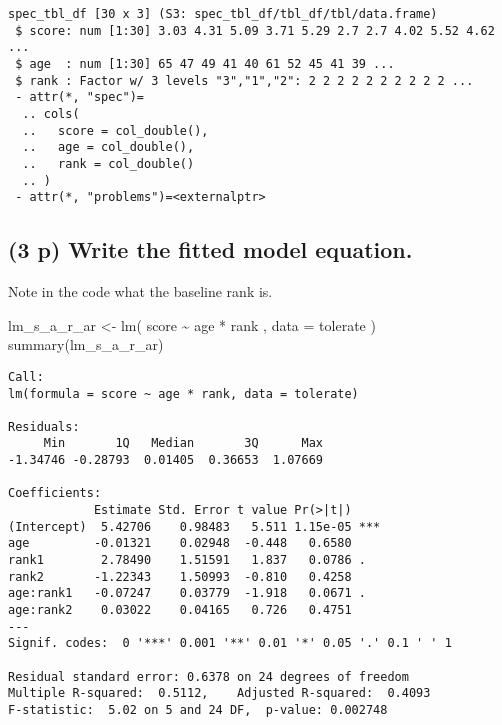 \documentclass[
  12pt,
]{article}
\newenvironment{Shaded}{\begin{snugshade}}{\end{snugshade}}
\newcommand{\AttributeTok}[1]{\textcolor[rgb]{0.77,0.63,0.00}{#1}}
\newcommand{\FunctionTok}[1]{\textcolor[rgb]{0.00,0.00,0.00}{#1}}
\newcommand{\NormalTok}[1]{#1}
\newcommand{\OtherTok}[1]{\textcolor[rgb]{0.56,0.35,0.01}{#1}}
\newcommand{\SpecialCharTok}[1]{\textcolor[rgb]{0.00,0.00,0.00}{#1}}
\begin{document}
\begin{verbatim}
spec_tbl_df [30 x 3] (S3: spec_tbl_df/tbl_df/tbl/data.frame)
 $ score: num [1:30] 3.03 4.31 5.09 3.71 5.29 2.7 2.7 4.02 5.52 4.62 ...
 $ age  : num [1:30] 65 47 49 41 40 61 52 45 41 39 ...
 $ rank : Factor w/ 3 levels "3","1","2": 2 2 2 2 2 2 2 2 2 2 ...
 - attr(*, "spec")=
  .. cols(
  ..   score = col_double(),
  ..   age = col_double(),
  ..   rank = col_double()
  .. )
 - attr(*, "problems")=<externalptr> 
\end{verbatim}

\hypertarget{p-write-the-fitted-model-equation.-1}{%
\subsection{\texorpdfstring{\textbf{(3 p)} Write the fitted model
equation.}{(3 p) Write the fitted model equation.}}\label{p-write-the-fitted-model-equation.-1}}

Note in the code what the baseline rank is.

\begin{Shaded}
\begin{Highlighting}[]
\NormalTok{lm\_s\_a\_r\_ar }\OtherTok{\textless{}{-}}
  \FunctionTok{lm}\NormalTok{(}
\NormalTok{    score }\SpecialCharTok{\textasciitilde{}}\NormalTok{ age }\SpecialCharTok{*}\NormalTok{ rank}
\NormalTok{  , }\AttributeTok{data =}\NormalTok{ tolerate}
\NormalTok{  )}
\FunctionTok{summary}\NormalTok{(lm\_s\_a\_r\_ar)}
\end{Highlighting}
\end{Shaded}

\begin{verbatim}
Call:
lm(formula = score ~ age * rank, data = tolerate)

Residuals:
     Min       1Q   Median       3Q      Max 
-1.34746 -0.28793  0.01405  0.36653  1.07669 

Coefficients:
            Estimate Std. Error t value Pr(>|t|)    
(Intercept)  5.42706    0.98483   5.511 1.15e-05 ***
age         -0.01321    0.02948  -0.448   0.6580    
rank1        2.78490    1.51591   1.837   0.0786 .  
rank2       -1.22343    1.50993  -0.810   0.4258    
age:rank1   -0.07247    0.03779  -1.918   0.0671 .  
age:rank2    0.03022    0.04165   0.726   0.4751    
---
Signif. codes:  0 '***' 0.001 '**' 0.01 '*' 0.05 '.' 0.1 ' ' 1

Residual standard error: 0.6378 on 24 degrees of freedom
Multiple R-squared:  0.5112,    Adjusted R-squared:  0.4093 
F-statistic:  5.02 on 5 and 24 DF,  p-value: 0.002748
\end{verbatim}
\end{document}
